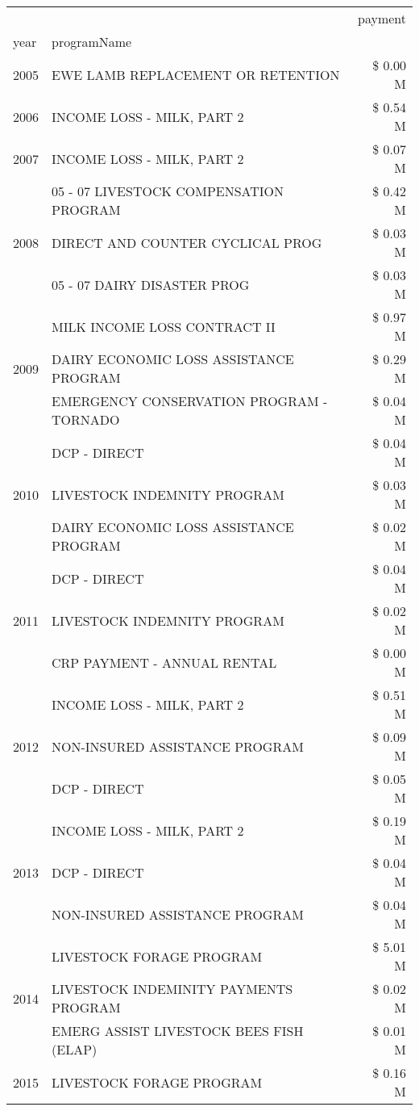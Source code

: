 \begin{tabular}{llr}
\toprule
 &  & payment \\
year & programName &  \\
\midrule
2005 & EWE LAMB REPLACEMENT OR RETENTION & \$ 0.00 M \\
\cline{1-3}
2006 & INCOME LOSS - MILK, PART 2 & \$ 0.54 M \\
\cline{1-3}
2007 & INCOME LOSS - MILK, PART 2 & \$ 0.07 M \\
\cline{1-3}
\multirow[t]{3}{*}{2008} & 05 - 07 LIVESTOCK COMPENSATION PROGRAM & \$ 0.42 M \\
 & DIRECT AND COUNTER CYCLICAL PROG & \$ 0.03 M \\
 & 05 - 07 DAIRY DISASTER PROG & \$ 0.03 M \\
\cline{1-3}
\multirow[t]{3}{*}{2009} & MILK INCOME LOSS CONTRACT II & \$ 0.97 M \\
 & DAIRY ECONOMIC LOSS ASSISTANCE PROGRAM & \$ 0.29 M \\
 & EMERGENCY CONSERVATION PROGRAM - TORNADO & \$ 0.04 M \\
\cline{1-3}
\multirow[t]{3}{*}{2010} & DCP - DIRECT & \$ 0.04 M \\
 & LIVESTOCK INDEMNITY PROGRAM & \$ 0.03 M \\
 & DAIRY ECONOMIC LOSS ASSISTANCE PROGRAM & \$ 0.02 M \\
\cline{1-3}
\multirow[t]{3}{*}{2011} & DCP - DIRECT & \$ 0.04 M \\
 & LIVESTOCK INDEMNITY PROGRAM & \$ 0.02 M \\
 & CRP PAYMENT - ANNUAL RENTAL & \$ 0.00 M \\
\cline{1-3}
\multirow[t]{3}{*}{2012} & INCOME LOSS - MILK, PART 2 & \$ 0.51 M \\
 & NON-INSURED ASSISTANCE PROGRAM & \$ 0.09 M \\
 & DCP - DIRECT & \$ 0.05 M \\
\cline{1-3}
\multirow[t]{3}{*}{2013} & INCOME LOSS - MILK, PART 2 & \$ 0.19 M \\
 & DCP - DIRECT & \$ 0.04 M \\
 & NON-INSURED ASSISTANCE PROGRAM & \$ 0.04 M \\
\cline{1-3}
\multirow[t]{3}{*}{2014} & LIVESTOCK FORAGE PROGRAM & \$ 5.01 M \\
 & LIVESTOCK INDEMINITY PAYMENTS PROGRAM & \$ 0.02 M \\
 & EMERG ASSIST LIVESTOCK BEES FISH (ELAP) & \$ 0.01 M \\
\cline{1-3}
\multirow[t]{3}{*}{2015} & LIVESTOCK FORAGE PROGRAM & \$ 0.16 M \\

\end{tabular}
